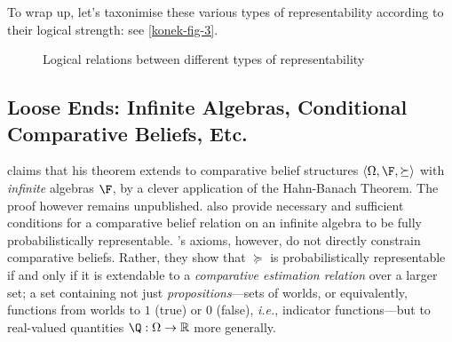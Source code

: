 To wrap up, let's taxonimise these various types of representability according to their logical strength: see \autoref{konek-fig-3}.
\begin{figure}
\centering
{}
\caption{Logical relations between different types of representability}\label{konek-fig-3}
\end{figure}


\subsection{Loose Ends: Infinite Algebras, Conditional Comparative Beliefs, Etc.}

\citet[p. 247]{Scott1964} claims that his theorem extends to comparative belief structures $\left<\Omega,\F,\succeq\right>$ with \textit{infinite} algebras $\F$, by a clever application of the Hahn-Banach Theorem. The proof however remains unpublished. \citet{Suppes1976} also provide necessary and sufficient conditions for a comparative belief relation on an infinite algebra to be fully probabilistically representable. \citeauthor{Suppes1976}'s axioms, however, do not directly constrain comparative beliefs. Rather, they show that $\succeq$ is probabilistically representable if and only if it is extendable to a \textit{comparative estimation relation} over a larger set; a set containing not just \textit{propositions}---sets of worlds, or equivalently, functions from worlds to $1$ (true) or $0$ (false), \textit{i.e.}, indicator functions---but to real-valued quantities $\Q:\Omega\rightarrow\mathbb{R}$ more generally.

